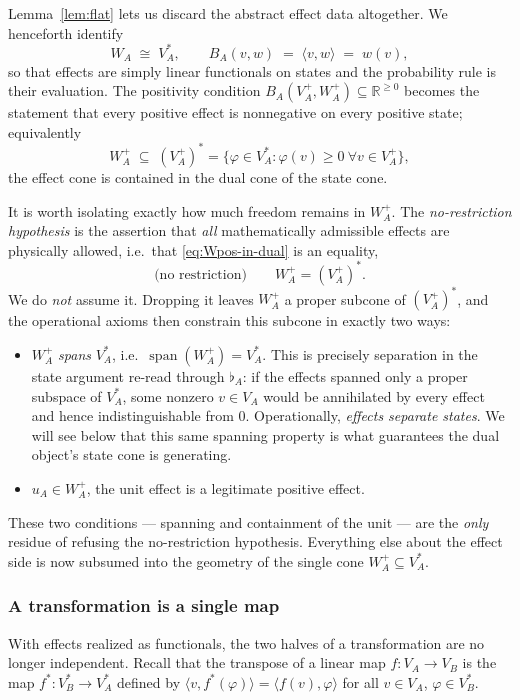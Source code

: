 \documentclass[prl,aps,10pt,superscriptaddress, floatfix]{revtex4-2}
\begin{document}
Lemma~\ref{lem:flat} lets us discard the abstract effect data altogether. We henceforth identify
\[
W_A\;\cong\;V_A^*,\qquad B_A(v,w)\;=\;\langle v,w\rangle\;=\;w(v),
\]
so that effects are simply linear functionals on states and the probability rule is their evaluation. The positivity condition $B_A(V_A^+,W_A^+)\subseteq\mathbb{R}^{\ge0}$ becomes the statement that every positive effect is nonnegative on every positive state; equivalently
\begin{equation}\label{eq:Wpos-in-dual}
W_A^+\;\subseteq\;(V_A^+)^*=\{\varphi\in V_A^*:\varphi(v)\ge0\ \forall v\in V_A^+\},
\end{equation}
the effect cone is contained in the dual cone of the state cone.

It is worth isolating exactly how much freedom remains in $W_A^+$. The \emph{no-restriction hypothesis} is the assertion that \emph{all} mathematically admissible effects are physically allowed, i.e.\ that \eqref{eq:Wpos-in-dual} is an equality,
\[
\text{(no restriction)}\qquad W_A^+=(V_A^+)^*.
\]
We do \emph{not} assume it. Dropping it leaves $W_A^+$ a proper subcone of $(V_A^+)^*$, and the operational axioms then constrain this subcone in exactly two ways:
\begin{itemize}
\item[(a)] $W_A^+$ \emph{spans} $V_A^*$, i.e.\ $\operatorname{span}(W_A^+)=V_A^*$. This is precisely separation in the state argument re-read through $\flat_A$: if the effects spanned only a proper subspace of $V_A^*$, some nonzero $v\in V_A$ would be annihilated by every effect and hence indistinguishable from $0$. Operationally, \emph{effects separate states}. We will see below that this same spanning property is what guarantees the dual object's state cone is generating.
\item[(b)] $u_A\in W_A^+$, the unit effect is a legitimate positive effect.
\end{itemize}
These two conditions --- spanning and containment of the unit --- are the \emph{only} residue of refusing the no-restriction hypothesis. Everything else about the effect side is now subsumed into the geometry of the single cone $W_A^+\subseteq V_A^*$.

\subsubsection*{A transformation is a single map}

With effects realized as functionals, the two halves of a transformation are no longer independent. Recall that the transpose of a linear map $f:V_A\to V_B$ is the map $f^*:V_B^*\to V_A^*$ defined by $\langle v,f^*(\varphi)\rangle=\langle f(v),\varphi\rangle$ for all $v\in V_A$, $\varphi\in V_B^*$.
\end{document}
